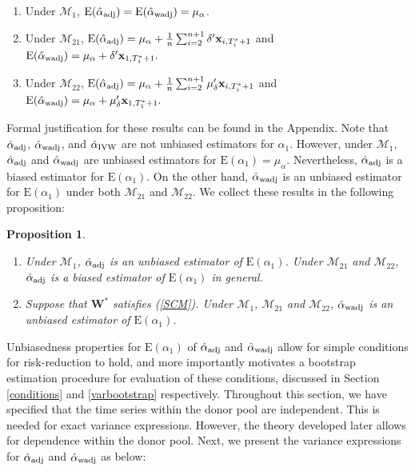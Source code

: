 \documentclass[11pt,3p,review,authoryear]{elsarticle}
\def\mbf#1{\mathbf{#1}} %
\def\mc#1{\mathcal{#1}} %
\def\E#1{\mathrm{E}(#1)} %
\newtheorem{prop}{Proposition}
\theoremstyle{definition}
\begin{document}
 \begin{enumerate}[label = (\roman*)]
    \item Under $\mc{M}_{1}$, $\E{\hat{\alpha}_{\rm adj}}=\E{\hat{\alpha}_{\rm wadj}} = \mu_{\alpha}$.
    \item Under $\mc{M}_{21}$, 
    $
      \E{\hat{\alpha}_{\rm adj}} = \mu_{\alpha} + \frac{1}{n} \sum_{i=2}^{n+1} \delta' \mbf{x}_{i, T_i^*+1}
    $
    and
    $
       \E{\hat{\alpha}_{\rm wadj}} = \mu_{\alpha} + \delta'\mbf{x}_{1, T_1^*+1} .
    $
    \item Under $\mc{M}_{22}$,
    $
      \E{\hat{\alpha}_{\rm adj}} = \mu_{\alpha} + \frac{1}{n} \sum_{i=2}^{n+1} \mu_{\delta}' \mbf{x}_{i, T_i^*+1}
    $
    and
    $
       \E{\hat{\alpha}_{\rm wadj}} = \mu_{\alpha} + \mu_{\delta}'\mbf{x}_{1, T_1^*+1} .
    $
  \end{enumerate}
Formal justification for these results can be found in the Appendix. Note that $\hat{\alpha}_{\rm adj}$, $\hat{\alpha}_{\rm wadj}$, and $\hat{\alpha}_{\rm IVW}$ are not unbiased estimators for $\alpha_1$. However, under $\mc{M}_{1}$, $\hat{\alpha}_{\rm adj}$ and $\hat{\alpha}_{\rm wadj}$ are unbiased estimators for $\E{\alpha_1}=\mu_{\alpha}$. Nevertheless, $\hat{\alpha}_{\rm adj}$ is a biased estimator for $\E{\alpha_1}$. On the other hand, $\hat{\alpha}_{\rm wadj}$ is an unbiased estimator for $\E{\alpha_1}$ under both $\mc{M}_{21}$ and $\mc{M}_{22}$. We collect these results in the following proposition: 

\begin{prop}
\label{unbiased} 
\quad 
\begin{enumerate}[label = (\roman*)]
  \item Under $\mc{M}_1$, $\hat{\alpha}_{\rm adj}$ is an unbiased estimator of $\E{\alpha_1}$. Under $\mc{M}_{21}$ and $\mc{M}_{22}$, $\hat{\alpha}_{\rm adj}$ is a biased estimator of $\E{\alpha_1}$ in general.
  \item Suppose that $\mbf{W}^*$ satisfies (\ref{SCM}). Under $\mc{M}_{1}$, $\mc{M}_{21}$ and $\mc{M}_{22}$, $\hat{\alpha}_{\rm wadj}$ is an unbiased estimator of $\E{\alpha_1}$.
\end{enumerate}
\end{prop}


Unbiasedness properties for $\E{\alpha_1}$ of $\hat{\alpha}_{\rm adj}$ and $\hat{\alpha}_{\rm wadj}$ allow for simple conditions for risk-reduction to hold, and more importantly motivates a bootstrap estimation procedure for evaluation of these conditions, discussed in Section \ref{conditions} and \ref{varbootstrap} respectively. Throughout this section, we have specified that the time series within the donor pool are independent. This is needed for exact variance expressions. However, the theory developed later allows for dependence within the donor pool. Next, we present the variance expressions for $\hat{\alpha}_{\rm adj}$ and $\hat{\alpha}_{\rm wadj}$ as below: 
\end{document}

